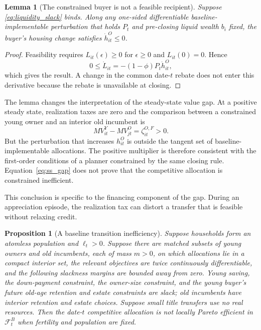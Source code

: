 \documentclass[11pt]{article}
\newtheorem{proposition}{Proposition}
\newtheorem{lemma}{Lemma}
\begin{document}
\begin{lemma}[The constrained buyer is not a feasible recipient]
\label{lem:tangent}
Suppose \eqref{eq:liquidity_slack} binds.  Along any one-sided differentiable
baseline-implementable perturbation that holds $P_t$ and pre-closing liquid
wealth $b_i$ fixed, the buyer's housing change satisfies
$\dot h_{it}^{O}\leq0$.
\end{lemma}

\begin{proof}
Feasibility requires $L_{it}(\epsilon)\geq0$ for $\epsilon\geq0$ and
$L_{it}(0)=0$.  Hence
\[
 0\leq \dot L_{it}=-(1-\phi)P_t\dot h_{it}^{O},
\]
which gives the result.  A change in the common date-$t$ rebate does not enter
this derivative because the rebate is unavailable at closing.
\end{proof}

The lemma changes the interpretation of the steady-state value gap.  At a
positive steady state, realization taxes are zero and the comparison between a
constrained young owner and an interior old incumbent is
\begin{equation}
 MV_{it}^{Y}-MV_{jt}^{O}=\zeta_{it}^{O,F}>0.
 \label{eq:ss_gap}
\end{equation}
But the perturbation that increases $h_{it}^{O}$ is outside the tangent set of
baseline-implementable allocations.  The positive multiplier is therefore
consistent with the first-order conditions of a planner constrained by the
same closing rule.  Equation~\eqref{eq:ss_gap} does not prove that the
competitive allocation is constrained inefficient.

This conclusion is specific to the financing component of the gap.  During an
appreciation episode, the realization tax can distort a transfer that is
feasible without relaxing credit.

\begin{proposition}[A baseline transition inefficiency]
\label{prop:baseline_tax}
Suppose households form an atomless population and $\ell_t>0$.  Suppose there
are matched subsets of young owners and old incumbents, each of mass $m>0$, on
which allocations lie in a compact interior set, the relevant objectives are
twice continuously differentiable, and the following slackness margins are
bounded away from zero.  Young saving, the
down-payment constraint, the owner-size constraint, and the young buyer's
future old-age retention and estate constraints are slack; old incumbents have
interior retention and estate choices.  Suppose small title transfers use no
real resources.  Then the date-$t$ competitive allocation is not locally
Pareto efficient in $\mathcal F_t^B$ when fertility and population are fixed.
\end{proposition}
\end{document}
